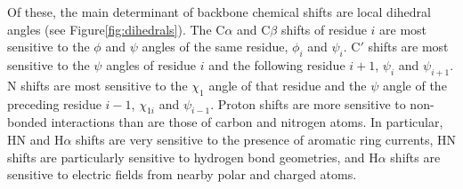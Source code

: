 \documentclass[9pt,review]{livecoms}
\begin{document}
Of these, the main determinant of backbone chemical shifts are local dihedral angles (see Figure\ref{fig:dihedrals}).
The C$\alpha$ and C$\beta$ shifts of residue $i$ are most sensitive to the $\phi$ and $\psi$ angles of the same residue, $\phi_i$ and $\psi_i$.
C$'$ shifts are most sensitive to the $\psi$ angles of residue $i$ and the following residue $i+1$, $\psi_i$ and $\psi_{i+1}$.
N shifts are most sensitive to the $\chi_1$ angle of that residue and the $\psi$ angle of the preceding residue $i-1$, $\chi_{1i}$ and $\psi_{i-1}$.
Proton shifts are more sensitive to non-bonded interactions than are those of carbon and nitrogen atoms.
In particular, HN and H$\alpha$ shifts are very sensitive to the presence of aromatic ring currents, HN shifts are particularly sensitive to hydrogen bond geometries, and H$\alpha$ shifts are sensitive to electric fields from nearby polar and charged atoms.
\end{document}
